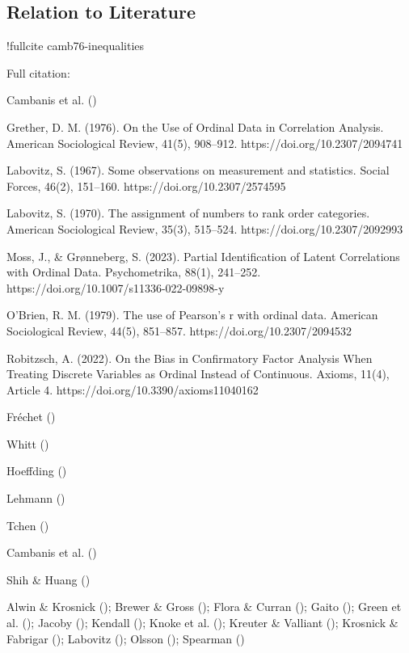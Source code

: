 \documentclass[
  12pt,
]{article}
\theoremstyle{plain}
\theoremstyle{definition}
\theoremstyle{remark}
\begin{document}
\subsection{Relation to Literature}\label{relation-to-literature}

!fullcite camb76-inequalities

Full citation:

Cambanis et al. ()

Grether, D. M. (1976). On the Use of Ordinal Data in Correlation
Analysis. American Sociological Review, 41(5), 908--912.
https://doi.org/10.2307/2094741

Labovitz, S. (1967). Some observations on measurement and statistics.
Social Forces, 46(2), 151--160. https://doi.org/10.2307/2574595

Labovitz, S. (1970). The assignment of numbers to rank order categories.
American Sociological Review, 35(3), 515--524.
https://doi.org/10.2307/2092993

Moss, J., \& Grønneberg, S. (2023). Partial Identification of Latent
Correlations with Ordinal Data. Psychometrika, 88(1), 241--252.
https://doi.org/10.1007/s11336-022-09898-y

O'Brien, R. M. (1979). The use of Pearson's r with ordinal data.
American Sociological Review, 44(5), 851--857.
https://doi.org/10.2307/2094532

Robitzsch, A. (2022). On the Bias in Confirmatory Factor Analysis When
Treating Discrete Variables as Ordinal Instead of Continuous. Axioms,
11(4), Article 4. https://doi.org/10.3390/axioms11040162

Fréchet ()

Whitt ()

Hoeffding ()

Lehmann ()

Tchen ()

Cambanis et al. ()

Shih \& Huang ()

Alwin \& Krosnick (); Brewer \&
Gross (); Flora \& Curran
(); Gaito
(); Green et al.
(); Jacoby
(); Kendall
(); Knoke et al.
(); Kreuter \& Valliant
(); Krosnick \& Fabrigar
(); Labovitz
(); Olsson
(); Spearman
()
\end{document}
